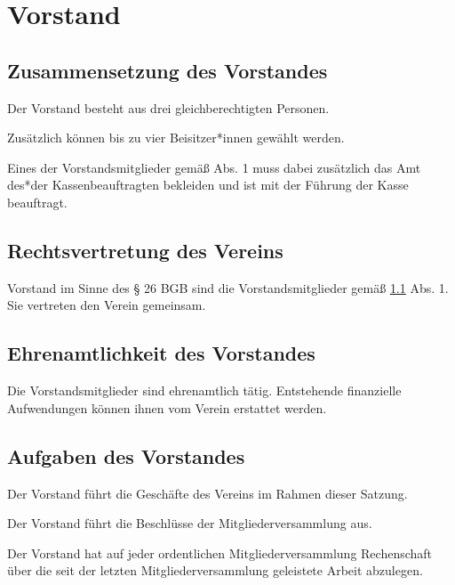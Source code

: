 \chapter{Vorstand}

\section{Zusammensetzung des Vorstandes}\label{cha:vorstand}
\begin{absätze}
    \item Der Vorstand besteht aus drei gleichberechtigten Personen.
    \item Zusätzlich können bis zu vier Beisitzer*innen gewählt werden.
    \item Eines der Vorstandsmitglieder gemäß Abs. 1 muss dabei zusätzlich das Amt des*der Kassenbeauftragten bekleiden und ist mit der Führung der Kasse beauftragt.        \end{absätze}

\section{Rechtsvertretung des Vereins}
\begin{absätze}
    \item Vorstand im Sinne des § 26 BGB sind die Vorstandsmitglieder gemäß \ref{cha:vorstand} Abs. 1. Sie vertreten den Verein gemeinsam.
\end{absätze}

\section{Ehrenamtlichkeit des Vorstandes}
Die Vorstandsmitglieder sind ehrenamtlich tätig. Entstehende finanzielle Aufwendungen können ihnen vom Verein erstattet werden.
    
\section{Aufgaben des Vorstandes}
\begin{absätze}
    \item Der Vorstand führt die Geschäfte des Vereins im Rahmen dieser Satzung.
    \item Der Vorstand führt die Beschlüsse der Mitgliederversammlung aus.
    \item Der Vorstand hat auf jeder ordentlichen Mitgliederversammlung Rechenschaft über die seit der letzten Mitgliederversammlung geleistete Arbeit abzulegen.
\end{absätze}

